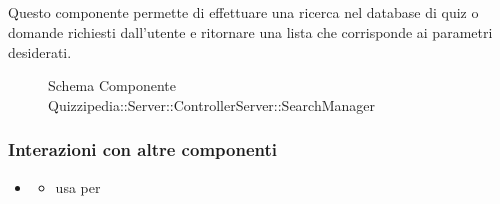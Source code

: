 \subsection{}
Questo componente permette di effettuare una ricerca nel database di quiz o domande richiesti dall'utente e ritornare una lista che corrisponde ai parametri desiderati.
\begin{figure}[H]
\centering
\noindent{}
\caption[Schema Componente Quizzipedia::Server::ControllerServer::SearchManager]{Schema Componente Quizzipedia::Server::ControllerServer::SearchManager}
\end{figure}
\subsubsection{Interazioni con altre componenti}
\begin{itemize}
\item {}
\begin{itemize}
\item usa  per 
\end{itemize}
\end{itemize}
